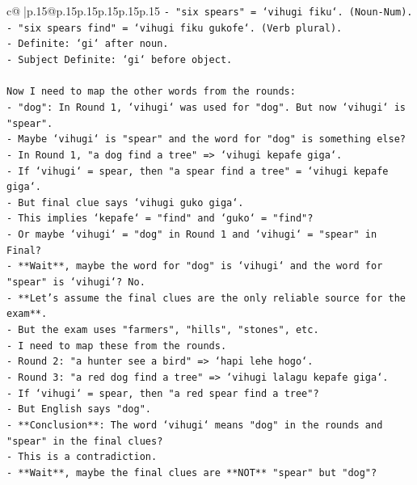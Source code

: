 \documentclass{article}
\begin{document}
{\begin{supertabular}{c@{$\;$}|p{.15\linewidth}@{}p{.15\linewidth}p{.15\linewidth}p{.15\linewidth}p{.15\linewidth}p{.15\linewidth}}
{{{\texttt{{-} "six spears" = `vihugi fiku`. (Noun{-}Num).} \\
\texttt{{-} "six spears find" = `vihugi fiku gukofe`. (Verb plural).} \\
\texttt{{-} Definite: `gi` after noun.} \\
\texttt{{-} Subject Definite: `gi` before object.} \\
\\ 
\texttt{Now I need to map the other words from the rounds:} \\
\texttt{{-} "dog": In Round 1, `vihugi` was used for "dog". But now `vihugi` is "spear".} \\
\texttt{{-} Maybe `vihugi` is "spear" and the word for "dog" is something else?} \\
\texttt{{-} In Round 1, "a dog find a tree" => `vihugi kepafe giga`.} \\
\texttt{{-} If `vihugi` = spear, then "a spear find a tree" = `vihugi kepafe giga`.} \\
\texttt{{-} But final clue says `vihugi guko giga`.} \\
\texttt{{-} This implies `kepafe` = "find" and `guko` = "find"?} \\
\texttt{{-} Or maybe `vihugi` = "dog" in Round 1 and `vihugi` = "spear" in Final?} \\
\texttt{{-} **Wait**, maybe the word for "dog" is `vihugi` and the word for "spear" is `vihugi`? No.} \\
\texttt{{-} **Let's assume the final clues are the only reliable source for the exam**.} \\
\texttt{{-} But the exam uses "farmers", "hills", "stones", etc.} \\
\texttt{{-} I need to map these from the rounds.} \\
\texttt{{-} Round 2: "a hunter see a bird" => `hapi lehe hogo`.} \\
\texttt{{-} Round 3: "a red dog find a tree" => `vihugi lalagu kepafe giga`.} \\
\texttt{{-} If `vihugi` = spear, then "a red spear find a tree"?} \\
\texttt{{-} But English says "dog".} \\
\texttt{{-} **Conclusion**: The word `vihugi` means "dog" in the rounds and "spear" in the final clues?} \\
\texttt{{-} This is a contradiction.} \\
\texttt{{-} **Wait**, maybe the final clues are **NOT** "spear" but "dog"?} \\
}}}
\end{supertabular}}
\end{document}
